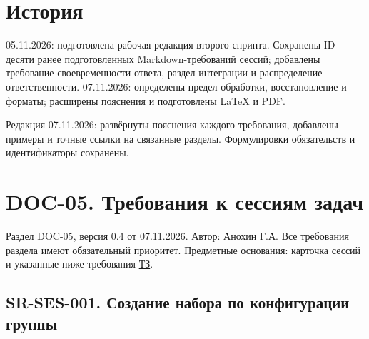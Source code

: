\documentclass[12pt,a4paper]{article}
\begin{document}
\section{История}\label{6-ux438ux441ux442ux43eux440ux438ux44f}

\hypertarget{6-история}{}

05.11.2026: подготовлена рабочая редакция второго спринта. Сохранены ID десяти ранее подготовленных Markdown-требований сессий; добавлены требование своевременности ответа, раздел интеграции и распределение ответственности. 07.11.2026: определены предел обработки, восстановление и форматы; расширены пояснения и подготовлены LaTeX и PDF.

Редакция 07.11.2026: развёрнуты пояснения каждого требования, добавлены примеры и точные ссылки на связанные разделы. Формулировки обязательств и идентификаторы сохранены.

\section{DOC-05. Требования к сессиям задач}\label{doc-05-ux442ux440ux435ux431ux43eux432ux430ux43dux438ux44f-ux43a-ux441ux435ux441ux441ux438ux44fux43c-ux437ux430ux434ux430ux447}

\hypertarget{doc-05-требования-к-сессиям-задач}{}

Раздел \hyperref[doc-05-ux441ux438ux441ux442ux435ux43cux43dux44bux435-ux442ux440ux435ux431ux43eux432ux430ux43dux438ux44f]{DOC-05}, версия 0.4 от 07.11.2026. Автор: Анохин Г.А. Все требования раздела имеют обязательный приоритет. Предметные основания: \href{../notes/domains/\%D0\%A1\%D0\%B5\%D1\%81\%D1\%81\%D0\%B8\%D0\%B8_\%D0\%B7\%D0\%B0\%D0\%B4\%D0\%B0\%D1\%87.pdf\#nameddest=\%D0\%BA\%D0\%B0\%D1\%80\%D1\%82\%D0\%BE\%D1\%87\%D0\%BA\%D0\%B0-\%D0\%B4\%D0\%BE\%D0\%BC\%D0\%B5\%D0\%BD\%D0\%B0-\%D1\%81\%D0\%B5\%D1\%81\%D1\%81\%D0\%B8\%D0\%B8-\%D0\%B7\%D0\%B0\%D0\%B4\%D0\%B0\%D1\%87}{карточка сессий} и указанные ниже требования \href{../02_\%D0\%A2\%D0\%B5\%D1\%85\%D0\%BD\%D0\%B8\%D1\%87\%D0\%B5\%D1\%81\%D0\%BA\%D0\%BE\%D0\%B5_\%D0\%B7\%D0\%B0\%D0\%B4\%D0\%B0\%D0\%BD\%D0\%B8\%D0\%B5/\%D0\%A2\%D0\%B5\%D1\%85\%D0\%BD\%D0\%B8\%D1\%87\%D0\%B5\%D1\%81\%D0\%BA\%D0\%BE\%D0\%B5_\%D0\%B7\%D0\%B0\%D0\%B4\%D0\%B0\%D0\%BD\%D0\%B8\%D0\%B5.pdf}{ТЗ}.

\subsection{SR-SES-001. Создание набора по конфигурации группы}\label{sr-ses-001-ux441ux43eux437ux434ux430ux43dux438ux435-ux43dux430ux431ux43eux440ux430-ux43fux43e-ux43aux43eux43dux444ux438ux433ux443ux440ux430ux446ux438ux438-ux433ux440ux443ux43fux43fux44b}
\end{document}

